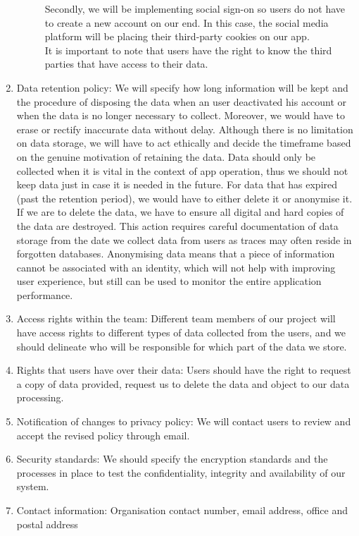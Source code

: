 \begin{enumerate}
\begin{description}
        Secondly, we will be implementing social sign-on so users do not have to create a new account on our end. In this case, the social media 
        platform will be placing their third-party cookies on our app.
        \\It is important to note that users have the right to know the third parties that have access to their data.
    \end{description}
    \item Data retention policy: We will specify how long information will be kept and the procedure of disposing the data when an user deactivated
    his account or when the data is no longer necessary to collect. Moreover, we would have to erase or rectify inaccurate data without delay. Although 
    there is no limitation on data storage, we will have to act ethically and
    decide the timeframe based on the genuine motivation of retaining the data. Data should only be collected when it is vital in the context
    of app operation, thus we should not keep data just in case it is needed in the future. For data that has expired (past the retention period), we 
    would have to either delete it or anonymise it. If we are to delete the data, we have to ensure all digital and hard copies of the data are destroyed. 
    This action requires careful documentation of data storage from the date we collect data from users as traces may often reside in forgotten databases.
    Anonymising data means that a piece of information cannot be associated with an identity, which will not help with improving user experience, but still 
    can be used to monitor the entire application performance.
    \item Access rights within the team: Different team members of our project will have access rights to different types of data collected from
    the users, and we should delineate who will be responsible for which part of the data we store.
    \item Rights that users have over their data: Users should have the right to request a copy of data provided, request us to delete the data and object to our data processing.
    \item Notification of changes to privacy policy: We will contact users to review and accept the revised policy through email.
    \item Security standards: We should specify the encryption standards and the processes in place to test the confidentiality, integrity and availability of 
    our system.
    \item Contact information: Organisation contact number, email address, office and postal address
\end{enumerate}

